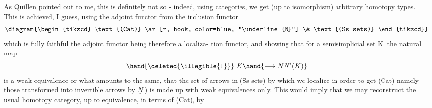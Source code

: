 As Quillen pointed out to me, this is definitely not so - indeed,
using categories, we get (up to isomorphism) arbitrary homotopy types.
This is achieved, I guess, using the  adjoint functor  from the
inclusion functor
\[ \diagram{\begin{tikzcd} \text{(Cat)} \ar[r, hook, color=blue, "\underline{N}"] \& \text{(Ss sets)} \end{tikzcd}} \]
which is fully faithful \hand{(}the adjoint functor being therefore a localiza-%
tion functor\hand{)}, and showing that for a semisimplicial set K, the natural
map
\[ \hand{\deleted{\illegible{1}}}\ K \hand{\longrightarrow NN'(K)} \]
is a weak equivalence\hand{,} or what amounts to the same, that the set of
arrows in (Ss sets) by which we localize in order to get (Cat) \hand{(}namely
those transformed into invertible arrows by $\underline{N}$')  is made up with
weak equivalences only. This would imply that we may reconstruct the
usual homotopy category, up to equivalence, in terms of (Cat), by
